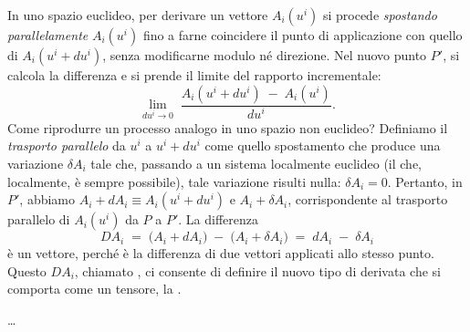 In uno spazio euclideo, per derivare un vettore $A_i(u^i)$ si procede \emph{spostando parallelamente} $A_i(u^i)$ fino a farne coincidere il punto di applicazione con quello di $A_i(u^i + du^i)$, senza modificarne modulo né direzione. Nel nuovo punto $P'$, si calcola la differenza e si prende il limite del rapporto incrementale:
$$
\lim_{du^i \to 0}\;\frac{A_i(u^i + du^i) \;-\; A_i(u^i)}{du^i}.
$$
Come riprodurre un processo analogo in uno spazio non euclideo? Definiamo il \emph{trasporto parallelo} da $u^i$ a $u^i + du^i$ come quello spostamento che produce una variazione $\delta A_i$ tale che, passando a un sistema localmente euclideo (il che, localmente, è sempre possibile), tale variazione risulti nulla: $\delta A_i = 0$. Pertanto, in $P'$, abbiamo $A_i + dA_i \equiv A_i(u^i + du^i)$ e $A_i + \delta A_i$, corrispondente al trasporto parallelo di $A_i(u^i)$ da $P$ a $P'$. La differenza
$$
DA_i
\;=\;
\bigl(A_i + dA_i\bigr) \;-\; \bigl(A_i + \delta A_i\bigr)
\;=\;
dA_i \;-\;\delta A_i
$$
è un vettore, perché è la differenza di due vettori applicati allo stesso punto. Questo $DA_i$, chiamato , ci consente di definire il nuovo tipo di derivata che si comporta come un tensore, la .

\dots
